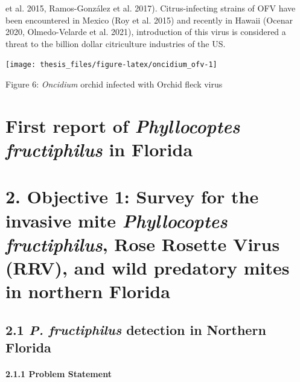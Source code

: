 \documentclass[12pt,final,CPage]{ufthesis}
\begin{document}
{et al. 2015, Ramos-González et al. 2017). Citrus-infecting strains of OFV have been encountered in Mexico (Roy et al. 2015) and recently in Hawaii (Ocenar 2020, Olmedo-Velarde et al. 2021), introduction of this virus is considered a threat to the billion dollar citriculture industries of the US.
  \begin{center}\texttt{[image: thesis\_files/figure-latex/oncidium\_ofv-1]} \end{center}

  Figure 6: \emph{Oncidium} orchid infected with Orchid fleck virus

  \hypertarget{first-report-of-phyllocoptes-fructiphilus-in-florida}{%
  \chapter{\texorpdfstring{First report of \emph{Phyllocoptes fructiphilus} in Florida}{First report of Phyllocoptes fructiphilus in Florida}}\label{first-report-of-phyllocoptes-fructiphilus-in-florida}}

  

  \hypertarget{survey}{%
  \chapter{\texorpdfstring{2. Objective 1: Survey for the invasive mite \emph{Phyllocoptes fructiphilus}, Rose Rosette Virus (RRV), and wild predatory mites in northern Florida}{2. Objective 1: Survey for the invasive mite Phyllocoptes fructiphilus, Rose Rosette Virus (RRV), and wild predatory mites in northern Florida}}\label{survey}}

  \hypertarget{survey-nfl}{%
  \section{\texorpdfstring{2.1 \emph{P. fructiphilus} detection in Northern Florida}{2.1 P. fructiphilus detection in Northern Florida}}\label{survey-nfl}}

  \hypertarget{problem-statement}{%
  \subsubsection{2.1.1 Problem Statement}\label{problem-statement}}

}
\end{document}
